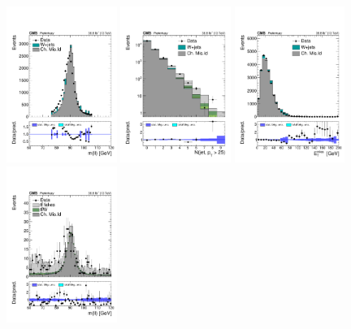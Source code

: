 \begin{figure}[htb]
        \centering 
        \includegraphics[width=0.32\textwidth]{ch10_figs/chargeFlip_closureDy/minMllAFAS.pdf}
        \includegraphics[width=0.32\textwidth]{ch10_figs/chargeFlip_closureDy/nJet25.pdf}
        \includegraphics[width=0.32\textwidth]{ch10_figs/chargeFlip_closureDy/met.pdf}\\
        \includegraphics[width=0.32\textwidth]{ch10_figs/chargeFlip_closureTt/minMllAFAS.pdf}

\end{figure}

